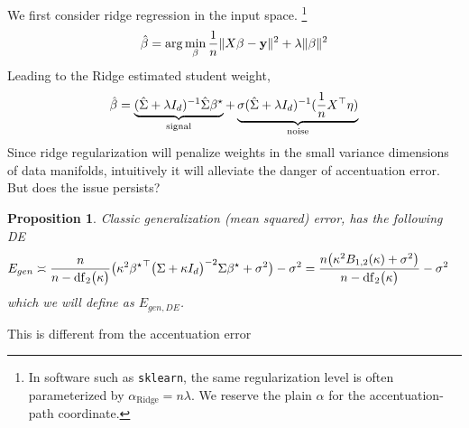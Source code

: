 \documentclass{article}
\providecommand{\propositionname}{Proposition}
\providecommand{\lemmaname}{Lemma}
\theoremstyle{plain}
\newtheorem{prop}[thm]{\propositionname}
\newtheorem{lem}[thm]{\lemmaname}
\theoremstyle{definition}
\theoremstyle{remark}
\begin{document}
We first consider ridge regression in the input space.
\footnote{In software such as \texttt{sklearn}, the same regularization level is often parameterized by $\alpha_{\mathrm{Ridge}}=n\lambda$. 
We reserve the plain $\alpha$ for the accentuation-path coordinate.}
\begin{equation}
    \hat{\beta}=\arg\min_\beta \frac1n\|X\beta-\mathbf y\|^2+\lambda\|\beta\|^2
\end{equation}
Leading to the Ridge estimated student weight, 
\begin{equation}\label{eq:ridge-decomposition}
\hat{\beta}=\underbrace{(\hat{\Sigma}+\lambda I_{d})^{-1}\hat{\Sigma}{\beta^{\star}}}_{\text{signal}}+\underbrace{\sigma(\hat{\Sigma}+\lambda I_{d})^{-1}(\frac{1}{n}X^{\top}\eta)}_{\text{noise}}
\end{equation}
Since ridge regularization will penalize weights in the small variance dimensions of data manifolds, intuitively it will alleviate the danger of accentuation error.
But does the issue persists?
\begin{prop}\label{prop:pix_ridge_gen_err}
Classic generalization (mean squared) error, has the following DE
\begin{align}
E_{gen} %
 &\asymp \frac{n}{n-\mathrm{df}_{2}\bigl(\kappa\bigr)}\big(\kappa^{2}{\bstar}^{\top}\bigl(\Sigma+\kappa I_{d}\bigr)^{-2}\Sigma\bstar+\sigma^{2}\big)-\sigma^{2} =\frac{n\big(\kappa^{2}B_{1,2}(\kappa)+\sigma^{2}\big)}{n-\mathrm{df}_{2}\bigl(\kappa\bigr)}-\sigma^{2}
\end{align}
which we will define as $E_{gen,DE}$.
\end{prop}
This is different from the accentuation error
\end{document}
